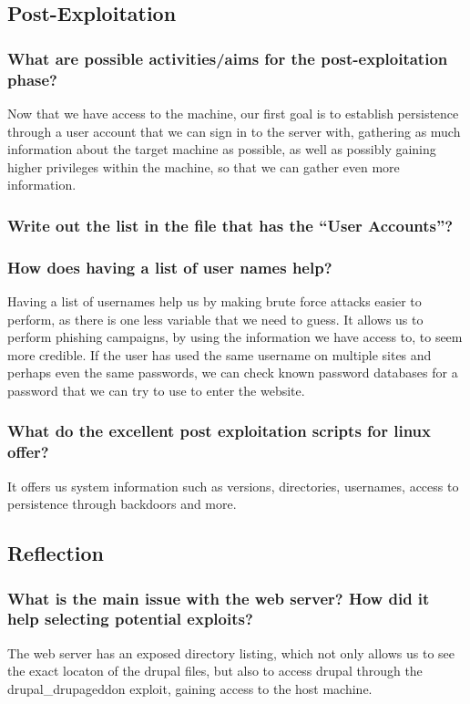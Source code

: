 \subsection{Post-Exploitation}
\subsubsection{What are possible activities/aims for the post-exploitation phase?}
Now that we have access to the machine, our first goal is to establish persistence through a user account that we can sign in to the server with, gathering as much information about the target machine as possible, as well as possibly gaining higher privileges within the machine, so that we can gather even more information.

\subsubsection{Write out the list in the file that has the “User Accounts”?}


\subsubsection{How does having a list of user names help?}
Having a list of usernames help us by making brute force attacks easier to perform, as there is one less variable that we need to guess. It allows us to perform phishing campaigns, by using the information we have access to, to seem more credible. If the user has used the same username on multiple sites and perhaps even the same passwords, we can check known password databases for a password that we can try to use to enter the website.

\subsubsection{What do the excellent post exploitation scripts for linux offer?}
It offers us system information such as versions, directories, usernames, access to persistence through backdoors and more.

\subsection{Reflection}

\subsubsection{What is the main issue with the web server? How did it help selecting potential exploits?}
The web server has an exposed directory listing, which not only allows us to see the exact locaton of the drupal files, but also to access drupal through the drupal\_drupageddon exploit, gaining access to the host machine.

